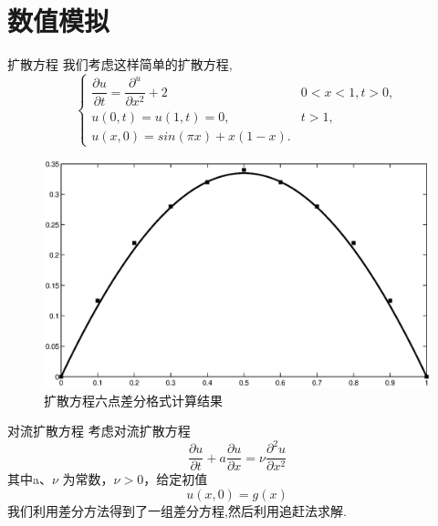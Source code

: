\documentclass[xcolor=svgnames]{beamer} %
\begin{document}
\section{数值模拟}
\begin{frame}{扩散方程}
我们考虑这样简单的扩散方程,
\begin{equation}
\begin{cases}
\dfrac{\partial u}{\partial t}=\dfrac{\partial^ u}{\partial x^2}+2 & 0<x<1,t>0, \\
u(0,t)=u(1,t)=0,& t>1, \\
u(x,0)=sin(\pi x)+x(1-x).
\end{cases}
\end{equation}
\end{frame}
\begin{frame}
\begin{figure}[h]
 \centering
 \includegraphics[scale=0.5]{./pic/6dcf.eps}
 \caption{扩散方程六点差分格式计算结果\label{fig:sm_ldcf}}
\end{figure}\par
\end{frame}
\begin{frame}{对流扩散方程}
考虑对流扩散方程
\begin{equation}\label{equ:cf_dkfangc}
	\dfrac{\partial u}{\partial t}+a\dfrac{\partial u}{\partial x}=\nu\dfrac{\partial^2 u}{\partial x^2}
\end{equation}
其中a、$\nu$ 为常数，$\nu>0$，给定初值
\begin{equation}
	u(x,0)=g(x)
\end{equation}
我们利用差分方法得到了一组差分方程,然后利用追赶法求解.
\end{frame}
\end{document}
